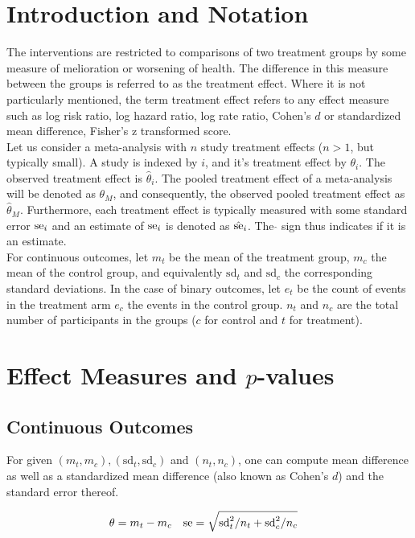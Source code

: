\documentclass[11pt,a4paper,twoside]{book}\usepackage[]{graphicx}\usepackage[]{color}
\begin{document}
\section{Introduction and Notation}
The interventions are restricted to comparisons of two treatment groups by some measure of melioration or worsening of health. The difference in this measure between the groups is referred to as the treatment effect. Where it is not particularly mentioned, the term treatment effect refers to any effect measure such as log risk ratio, log hazard ratio, log rate ratio, Cohen's $d$ or standardized mean difference, Fisher's z transformed score.\\
Let us consider a meta-analysis with $n$ study treatment effects ($n > 1$, but typically small). A study is indexed by $i$, and it's treatment effect by  $\theta_i$. The observed treatment effect is $\hat{\theta}_i$. The pooled treatment effect of a meta-analysis will be denoted as $\theta_M$, and consequently, the observed pooled treatment effect as $\hat{\theta}_M$. Furthermore, each treatment effect is typically measured with some standard error $\operatorname{se}_i$ and an estimate of $\operatorname{se}_i$ is denoted as $\hat{\operatorname{se}}_i$. The $\hat{}$ sign thus indicates if it is an estimate.\\
For continuous outcomes, let $m_t$ be the mean of the treatment group, $m_c$ the mean of the control group, and equivalently $\textrm{sd}_t$ and $\textrm{sd}_c$ the corresponding standard deviations. 
In the case of binary outcomes, let $e_t$ be the count of events in the treatment arm $e_c$ the events in the control group. $n_t$ and $n_c$ are the total number of participants in the groups ($c$ for control and $t$ for treatment).%

\section{Effect Measures and $p$\hspace{0.4mm}-values}
\subsection{Continuous Outcomes}
For given $(m_t, m_c), (\textrm{sd}_t, \textrm{sd}_c)$ and $(n_t, n_c)$, one can compute mean difference as well as a standardized mean difference (also known as Cohen's $d$) and the standard error thereof.

\begin{align}
\theta &= m_t - m_c & \operatorname{se} &= \sqrt{\textrm{sd}_t^2/n_t + \textrm{sd}_c^2/n_c}
\end{align}
\end{document}
